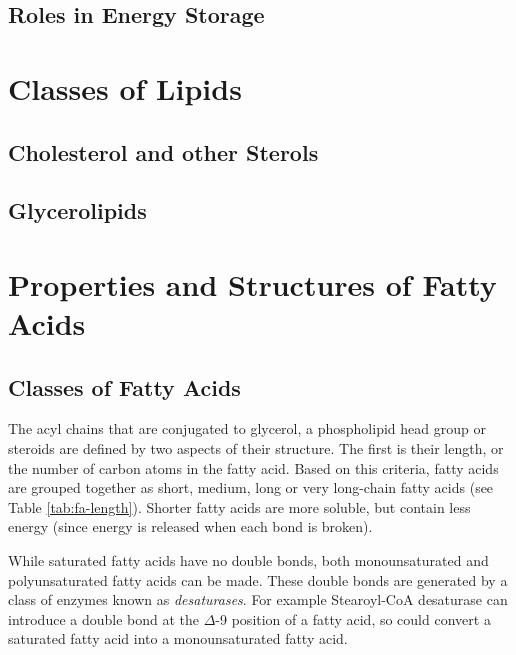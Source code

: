 \documentclass{tufte-handout}
\begin{document}
\subsection{Roles in Energy Storage}

\section{Classes of Lipids}

\subsection{Cholesterol and other Sterols}

\subsection{Glycerolipids}

\section{Properties and Structures of Fatty Acids}

\subsection{Classes of Fatty Acids}

The acyl chains that are conjugated to glycerol, a phospholipid head group or steroids are defined by two aspects of their structure.  The first is their length, or the number of carbon atoms in the fatty acid.  Based on this criteria, fatty acids are grouped together as short, medium, long or very long-chain fatty acids (see Table \ref{tab:fa-length}).  Shorter fatty acids are more soluble, but contain less energy (since energy is released when each bond is broken).  

  While saturated fatty acids have no double bonds, both monounsaturated and polyunsaturated fatty acids can be made.  These double bonds are generated by a class of enzymes known as \emph{desaturases}.  For example Stearoyl-CoA desaturase can introduce a double bond at the $\Delta$-9 position of a fatty acid, so could convert a saturated fatty acid into a monounsaturated fatty acid.
\end{document}
